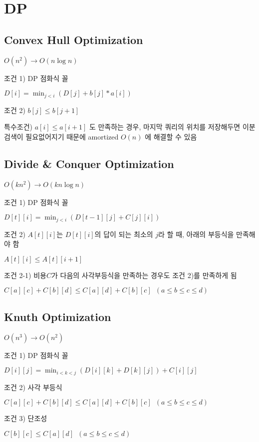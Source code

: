 \documentclass[10pt,landscape,a4paper,twocolumn]{article}
\begin{document}
\section{DP}

\subsection{Convex Hull Optimization}

$O(n^{2}) \to O(n\log{n})$

조건 1) DP 점화식 꼴

$D[i] = \min_{j<i}( D[j] + b[j] * a[i] )$

조건 2) $b[j] \leq b[j+1]$

특수조건) $a[i] \leq a[i+1]$ 도 만족하는 경우, 마지막 쿼리의 위치를 저장해두면 이분검색이 필요없어지기 때문에 amortized $O(n)$ 에 해결할 수 있음

\subsection{Divide \& Conquer Optimization}

$O(kn^{2}) \to O(kn\log{n})$

조건 1) DP 점화식 꼴

$D[t][i] = \min_{j<i}( D[t-1][j] + C[j][i] )$

조건 2) $A[t][i]$는 $D[t][i]$의 답이 되는 최소의 $j$라 할 때, 아래의 부등식을 만족해야 함

$A[t][i] \leq A[t][i+1]$

조건 2-1) 비용$C$가 다음의 사각부등식을 만족하는 경우도 조건 2)를 만족하게 됨

$C[a][c] + C[b][d] \leq C[a][d] + C[b][c] \phantom{1} (a \leq b \leq c \leq d)$

\subsection{Knuth Optimization}

$O(n^{3}) \to O(n^{2})$

조건 1) DP 점화식 꼴

$D[i][j] = \min_{i<k<j}( D[i][k] + D[k][j] ) + C[i][j]$

조건 2) 사각 부등식

$C[a][c] + C[b][d] \leq C[a][d] + C[b][c] \phantom{1} (a \leq b \leq c \leq d)$

조건 3) 단조성

$C[b][c] \leq C[a][d] \phantom{1} (a \leq b \leq c \leq d)$
\end{document}
